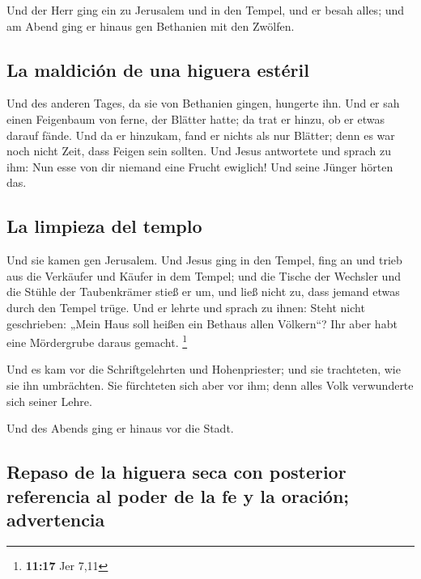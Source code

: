  Und der Herr ging ein zu Jerusalem und in den Tempel,
und er besah alles; und am Abend ging er hinaus gen Bethanien mit den
Zwölfen.

\hypertarget{la-maldiciuxf3n-de-una-higuera-estuxe9ril}{%
\subsection{La maldición de una higuera
estéril}\label{la-maldiciuxf3n-de-una-higuera-estuxe9ril}}

 Und des anderen Tages, da sie von Bethanien gingen,
hungerte ihn.  Und er sah einen Feigenbaum von ferne, der
Blätter hatte; da trat er hinzu, ob er etwas darauf fände. Und da er
hinzukam, fand er nichts als nur Blätter; denn es war noch nicht Zeit,
dass Feigen sein sollten.  Und Jesus antwortete und
sprach zu ihm: Nun esse von dir niemand eine Frucht ewiglich! Und seine
Jünger hörten das.

\hypertarget{la-limpieza-del-templo}{%
\subsection{La limpieza del templo}\label{la-limpieza-del-templo}}

 Und sie kamen gen Jerusalem. Und Jesus ging in den
Tempel, fing an und trieb aus die Verkäufer und Käufer in dem Tempel;
und die Tische der Wechsler und die Stühle der Taubenkrämer stieß er um,
 und ließ nicht zu, dass jemand etwas durch den Tempel
trüge.  Und er lehrte und sprach zu ihnen: Steht nicht
geschrieben: „Mein Haus soll heißen ein Bethaus allen Völkern``? Ihr
aber habt eine Mördergrube daraus gemacht. \footnote{\textbf{11:17} Jer
  7,11}

 Und es kam vor die Schriftgelehrten und Hohenpriester;
und sie trachteten, wie sie ihn umbrächten. Sie fürchteten sich aber vor
ihm; denn alles Volk verwunderte sich seiner Lehre.

 Und des Abends ging er hinaus vor die Stadt.

\hypertarget{repaso-de-la-higuera-seca-con-posterior-referencia-al-poder-de-la-fe-y-la-oraciuxf3n-advertencia}{%
\subsection{Repaso de la higuera seca con posterior referencia al poder
de la fe y la oración;
advertencia}\label{repaso-de-la-higuera-seca-con-posterior-referencia-al-poder-de-la-fe-y-la-oraciuxf3n-advertencia}}

